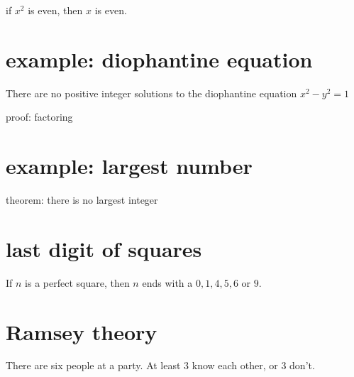 \documentclass[12pt]{handout}
\begin{document}
if $x^2$ is even, then $x$ is even.

\section*{example: diophantine equation}

There are no positive integer solutions to the diophantine equation $x^2 - y^2 = 1$

proof: factoring

\section*{example: largest number}

theorem: there is no largest integer

\section*{last digit of squares}

If $n$ is a perfect square, then $n$ ends with a $0, 1, 4, 5, 6$ or $9$.

\section*{Ramsey theory}

There are six people at a party.  At least 3 know each other, or 3 don't.
\end{document}
